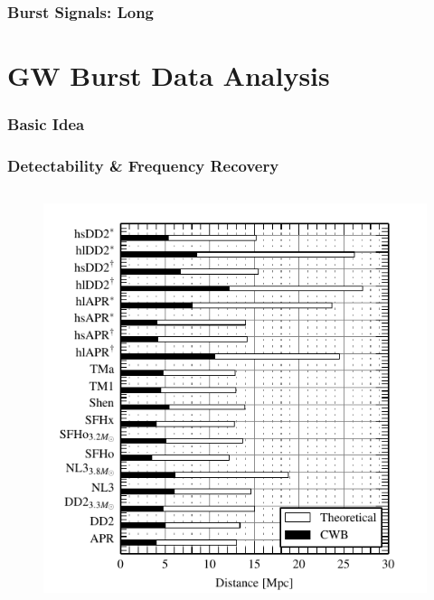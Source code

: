 \documentclass[serif,mathserif]{beamer}
\begin{document}
\begin{frame}
    \frametitle{Burst Signals: Long}
\end{frame}

\section{GW Burst Data Analysis}

\begin{frame}
    \frametitle{Basic Idea}
\end{frame}


\begin{frame}
    \frametitle{Detectability \& Frequency Recovery}

    \begin{columns}[]


        \begin{center}
            \vspace{-0.5cm}
            \begin{figure}
                \includegraphics[width=\columnwidth]{figures/distances.pdf}
            \end{figure}
        \end{center}



\end{columns}
\end{frame}
\end{document}
